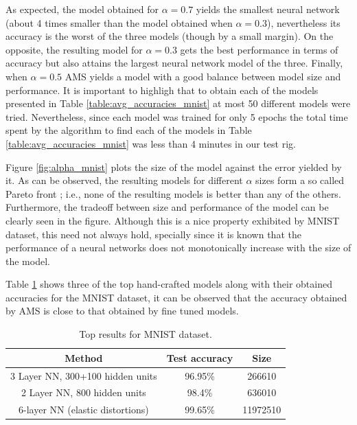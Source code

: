\documentclass[journal]{IEEEtran}
\begin{document}
As expected, the model obtained for $\alpha = 0.7$ yields the smallest neural network (about 4 times smaller than the model obtained when $\alpha = 0.3$), nevertheless its accuracy is the worst of the three models (though by a small margin). On the opposite, the resulting model for $\alpha = 0.3$ gets the best performance in terms of accuracy but also attains the largest neural network model of the three. Finally, when $\alpha = 0.5$ AMS yields a model with a good balance between model size and performance. It is important to highligh that to obtain each of the models presented in Table \ref{table:avg_accuracies_mnist} at most 50 different models were tried. Nevertheless, since each model was trained for only 5 epochs the total time spent by the algorithm to find each of the models in Table \ref{table:avg_accuracies_mnist} was less than 4 minutes in our test rig. 

Figure \ref{fig:alpha_mnist} plots the size of the model against the error yielded by it. As can be observed, the resulting models for different $\alpha$ sizes form a so called Pareto front \cite{Nocedal06}; i.e., none of the resulting models is better than any of the others. Furthermore, the tradeoff between size and performance of the model can be clearly seen in the figure. Although this is a nice property exhibited by MNIST dataset, this need not always hold, specially since it is known that the performance of a neural networks does not monotonically increase with the size of the model. 

Table \ref{table:MNIST_results_top} shows three of the top hand-crafted models along with their obtained accuracies for the MNIST dataset, it can be observed that the accuracy obtained by AMS is close to that obtained by fine tuned models. 

\begin{table}[!htb]
\begin{center}
\begin{tabular}{| c | c | c |}
\hline
Method & Test accuracy & Size\\
\hline
3 Layer NN, 300+100 hidden units \cite{lecun-98} &  96.95\% & 266610\\
2 Layer NN, 800 hidden units \cite{Simard2003} & 98.4\% & 636010\\
6-layer NN (elastic distortions) \cite{Ciresan2010}  & 99.65\% & 11972510\\
\hline
\end{tabular}
\end{center}
\caption{Top results for MNIST dataset.}
\label{table:MNIST_results_top}
\end{table}
\end{document}
